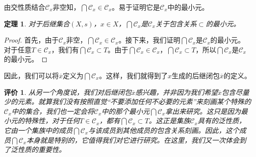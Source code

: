 \documentclass[oneside, 12pt]{ctexart}
\newtheorem{theorem}{定理}[section]
\newtheorem{remark}{评价}[section]
\begin{document}
由交性质结合$\mathcal{C}_x$非空知，$\bigcap\mathcal{C}_x \in \mathcal{C}_x$。易于证明它是$\mathcal{C}_x$中的最小元。

\begin{theorem}
	对于后继集合$(X, s)$，$x \in X$，$\bigcap\mathcal{C}_x$是$\mathcal{C}_x$关于包含关系$\subset$的最小元。
\end{theorem}

\begin{proof}
	首先，由于$\mathcal{C}_x$非空，$\bigcap\mathcal{C}_x \in \mathcal{C}_x$。接下来，我们证明$\bigcap\mathcal{C}_x$是$\mathcal{C}_x$的最小元。对于任意$T \in \mathcal{C}_x$，我们有$\bigcap\mathcal{C}_x \subset T$。由于$\bigcap\mathcal{C}_x \in \mathcal{C}_x$，$\bigcap\mathcal{C}_x \subset T$，所以$\bigcap\mathcal{C}_x$是$\mathcal{C}_x$的最小元。
\end{proof}

因此，我们可以将$\overline{x}$定义为$\bigcap\mathcal{C}_x$。这样，我们就得到了$x$生成的后继闭包$\overline{x}$的定义。

\begin{remark}
从另一个角度说，我们对后继闭包$\overline{x}$感兴趣，并非因为我们希望$\overline{x}$包含尽量少的元素。就算我们没有按照直觉“不要添加任何不必要的元素”来刻画某个特殊的$\mathcal{C}_x$中的集合，我们也一定会将$\mathcal{C}_x$中的那个最小元$\bigcap\mathcal{C}_x$拿出来研究。这只是因为最小元的特殊性，对于任何$T \in \mathcal{C}_x$，都有$\bigcap\mathcal{C}_x \subset T$。这正是集族$\mathcal{C}_x$具有的泛性质，它由一个集族中的成员$\bigcap\mathcal{C}_x$与该成员到其他成员的包含关系刻画。因此，这个成员$\bigcap\mathcal{C}_x$本身就是特别的，它值得我们对它进行研究。在这里，我们又一次体会到了泛性质的重要性。
\end{remark}
\end{document}
